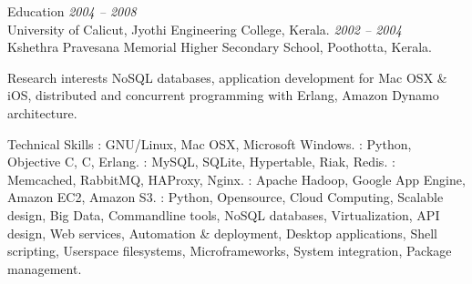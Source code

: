 \documentclass{resume}
\author{Sreejith Kesavan}
\begin{document}
\maketitle


\begin{category}{Education}
   \hfill {\em 2004 -- 2008}\\
  University of Calicut, Jyothi Engineering College, Kerala.
   \hfill {\em 2002 -- 2004}\\
  Kshethra Pravesana Memorial Higher Secondary School, Poothotta, Kerala.
\end{category}


\begin{category}{Research interests}
  \citemnobullet NoSQL databases, application development for Mac OSX \& iOS, 
  distributed and concurrent programming with Erlang, Amazon Dynamo architecture.
\end{category}

\begin{category}{Technical Skills}
  : GNU/Linux, Mac OSX, Microsoft Windows.
  : Python, Objective C, C, Erlang.
  : MySQL, SQLite, Hypertable, Riak, Redis.
  : Memcached, RabbitMQ, HAProxy, Nginx.
  : Apache Hadoop, Google App Engine, Amazon EC2, Amazon S3.
  : Python, Opensource, Cloud Computing, Scalable design, Big Data, 
  Commandline tools, NoSQL databases, Virtualization, API design, Web services, Automation \& deployment, 
  Desktop applications, Shell scripting, Userspace filesystems, Microframeworks, System integration, 
  Package management.
\end{category}

\end{document}
